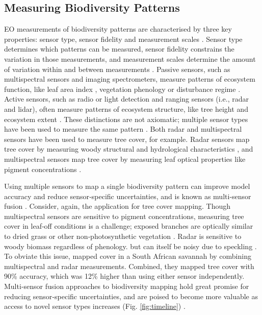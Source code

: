 \subsection{Measuring Biodiversity Patterns}

EO measurements of biodiversity patterns are characterised by three key properties: sensor type, sensor fidelity and measurement scales \cite{Pettorelli2014-pn, OConnor2015-bj}. Sensor type determines which patterns can be measured, sensor fidelity constrains the variation in those measurements, and measurement scales determine the amount of variation within and between measurements \cite{Jensen1987-nd}. Passive sensors, such as multispectral sensors and imaging spectrometers, measure patterns of ecosystem function, like leaf area index \cite{Fensholt2004-ew}, vegetation phenology \cite{Fan2015-gg} or disturbance regime \cite{Feng2008-hb}. Active sensors, such as radio or light detection and ranging sensors (i.e., radar and lidar), often measure patterns of ecosystem structure, like tree height \cite{Lefsky2005-nh} and ecosystem extent \cite{Bartsch2009-ze}. These distinctions are not axiomatic; multiple sensor types have been used to measure the same pattern \cite{Pohl1998-ze}. Both radar and multispectral sensors have been used to measure tree cover, for example. Radar sensors map tree cover by measuring woody structural and hydrological characteristics \cite{Walker2010-md, Shimada2014-wi}, and multispectral sensors map tree cover by measuring leaf optical properties like pigment concentrations \cite{Sims2002-ge, Sexton2013-rk}.

Using multiple sensors to map a single biodiversity pattern can improve model accuracy and reduce sensor‐specific uncertainties, and is known as multi‐sensor fusion \cite{Hall1997-ux}. Consider, again, the application for tree cover mapping. Though multispectral sensors are sensitive to pigment concentrations, measuring tree cover in leaf‐off conditions is a challenge; exposed branches are optically similar to dried grass or other non‐photosynthetic vegetation \cite{Asner1998-rw}. Radar is sensitive to woody biomass regardless of phenology. but can itself be noisy due to speckling \cite{lee1994speckle}. To obviate this issue, \cite{Naidoo2016-fp} mapped cover in a South African savannah by combining multispectral and radar measurements. Combined, they mapped tree cover with 90\% accuracy, which was 12\% higher than using either sensor independently. Multi‐sensor fusion approaches to biodiversity mapping hold great promise for reducing sensor‐specific uncertainties, and are poised to become more valuable as access to novel sensor types increases (Fig. \ref{fig:timeline}) \cite{Butler2014-tp, Schulte_to_Buhne2018-ai}.

